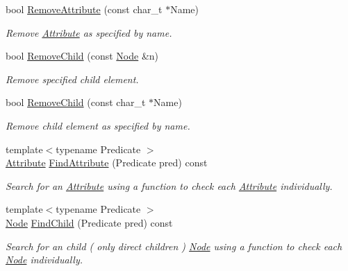 \begin{DoxyCompactItemize}
bool \hyperlink{classphys_1_1xml_1_1Node_ab166876c5dd5a43a16eb0a4c110be7ca}{RemoveAttribute} (const char\_\-t $\ast$Name)
\begin{DoxyCompactList}\small\item\em Remove \hyperlink{classphys_1_1xml_1_1Attribute}{Attribute} as specified by name. \item\end{DoxyCompactList}\item 
bool \hyperlink{classphys_1_1xml_1_1Node_a946bb656b94c9d3a561200cd2cd3ee11}{RemoveChild} (const \hyperlink{classphys_1_1xml_1_1Node}{Node} \&n)
\begin{DoxyCompactList}\small\item\em Remove specified child element. \item\end{DoxyCompactList}\item 
bool \hyperlink{classphys_1_1xml_1_1Node_a2612e301caa54ac6af135b8fb11b2e25}{RemoveChild} (const char\_\-t $\ast$Name)
\begin{DoxyCompactList}\small\item\em Remove child element as specified by name. \item\end{DoxyCompactList}\item 
{\footnotesize template$<$typename Predicate $>$ }\\\hyperlink{classphys_1_1xml_1_1Attribute}{Attribute} \hyperlink{classphys_1_1xml_1_1Node_af6cf25d1823ccf0f9f123825ef8537bd}{FindAttribute} (Predicate pred) const 
\begin{DoxyCompactList}\small\item\em Search for an \hyperlink{classphys_1_1xml_1_1Attribute}{Attribute} using a function to check each \hyperlink{classphys_1_1xml_1_1Attribute}{Attribute} individually. \item\end{DoxyCompactList}\item 
{\footnotesize template$<$typename Predicate $>$ }\\\hyperlink{classphys_1_1xml_1_1Node}{Node} \hyperlink{classphys_1_1xml_1_1Node_aba9be6b2bab1e5ca9ca7a201e887bd48}{FindChild} (Predicate pred) const 
\begin{DoxyCompactList}\small\item\em Search for an child ( only direct children ) \hyperlink{classphys_1_1xml_1_1Node}{Node} using a function to check each \hyperlink{classphys_1_1xml_1_1Node}{Node} individually. \item\end{DoxyCompactList}\item 

\end{DoxyCompactItemize}
